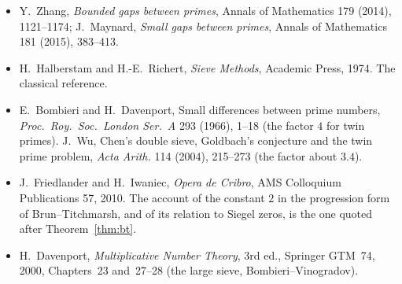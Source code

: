 \begin{itemize}
\item Y.~Zhang, \emph{Bounded gaps between primes}, Annals of Mathematics 179 (2014), 1121--1174; J.~Maynard, \emph{Small gaps between primes}, Annals of Mathematics 181 (2015), 383--413.
\item H.~Halberstam and H.-E.~Richert, \emph{Sieve Methods}, Academic Press, 1974. The classical reference.
\item E.~Bombieri and H.~Davenport, Small differences between prime numbers, \emph{Proc.\ Roy.\ Soc.\ London Ser.\ A} 293 (1966), 1--18 (the factor $4$ for twin primes). J.~Wu, Chen's double sieve, Goldbach's conjecture and the twin prime problem, \emph{Acta Arith.} 114 (2004), 215--273 (the factor about $3.4$).
\item J.~Friedlander and H.~Iwaniec, \emph{Opera de Cribro}, AMS Colloquium Publications 57, 2010. The account of the constant $2$ in the progression form of Brun--Titchmarsh, and of its relation to Siegel zeros, is the one quoted after Theorem~\ref{thm:bt}.
\item H.~Davenport, \emph{Multiplicative Number Theory}, 3rd ed., Springer GTM~74, 2000, Chapters~23 and~27--28 (the large sieve, Bombieri--Vinogradov).
\end{itemize}
